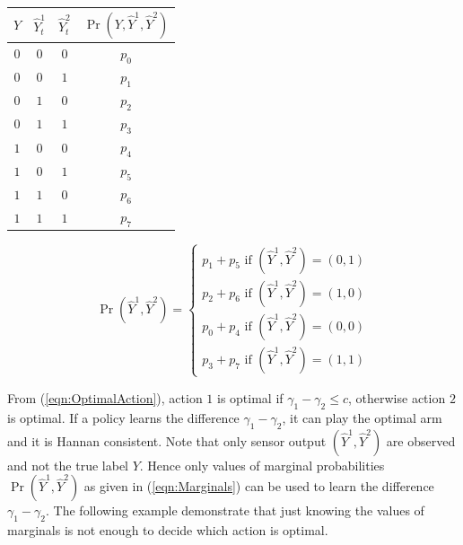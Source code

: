 \documentclass{article}
\begin{document}
\begin{minipage}{0.5\textwidth}
	\vspace{.5cm}
	\begin{tabular}[c]{ c|c|c|c } 
		\label{tab:SensorOutcomes}
		$Y$ & $\hat{Y}_t^1$ & $\hat{Y}_t^2$ & $\Pr(Y, \hat{Y}^1, \hat{Y}^2)$ \\ \hline 
		$0$ & $0$ & $0$ & $p_0$ \\  \hline
		$0$ & $0$ & $1$ & $p_1$ \\  \hline
		$0$ & $1$ & $0$ & $p_2$ \\  \hline
		$0$ & $1$ & $1$ & $p_3$ \\  \hline
		$1$ & $0$ & $0$ & $p_4$ \\  \hline
		$1$ & $0$ & $1$ & $p_5$ \\  \hline
		$1$ & $1$ & $0$ & $p_6$ \\  \hline
		$1$ & $1$ & $1$ & $p_7$ \\  \hline
		
	\end{tabular}
		\vspace{.5cm}
\end{minipage}\hspace{-1.5cm}
\begin{minipage}[c]{0.6\textwidth}
		\vspace{.5cm}
		\centering
	\hspace{-5cm}		
\begin{equation}
\label{eqn:Marginals}
\Pr(\hat{Y}^1, \hat{Y}^2)=
\begin{cases}
p_1 + p_5 \mbox{  if } (\hat{Y}^1, \hat{Y}^2)=(0,1)\\
p_2 + p_6 \mbox{  if } (\hat{Y}^1, \hat{Y}^2)=(1,0)\\
p_0 + p_4 \mbox{  if } (\hat{Y}^1, \hat{Y}^2)=(0,0)\\
p_3 + p_7 \mbox{  if } (\hat{Y}^1, \hat{Y}^2)=(1,1)
\end{cases}
\end{equation}
	\vspace{.5cm}
\end{minipage}

\noindent
From (\ref{eqn:OptimalAction}), action $1$ is optimal if $\gamma_1 - \gamma_2 \leq c$, otherwise action $2$ is optimal. If a policy learns the difference $\gamma_1-\gamma_2$, it can play the optimal arm and it is Hannan consistent. Note that only sensor output $(\hat{Y}^1, \hat{Y}^2)$ are observed and not the true label $Y$. Hence only values of marginal probabilities $\Pr(\hat{Y}^1, \hat{Y}^2)$ as given in (\ref{eqn:Marginals}) can be used to learn the difference $\gamma_1-\gamma_2$. The following example demonstrate that just knowing the values of marginals is not enough to decide which action is optimal.
\end{document}
